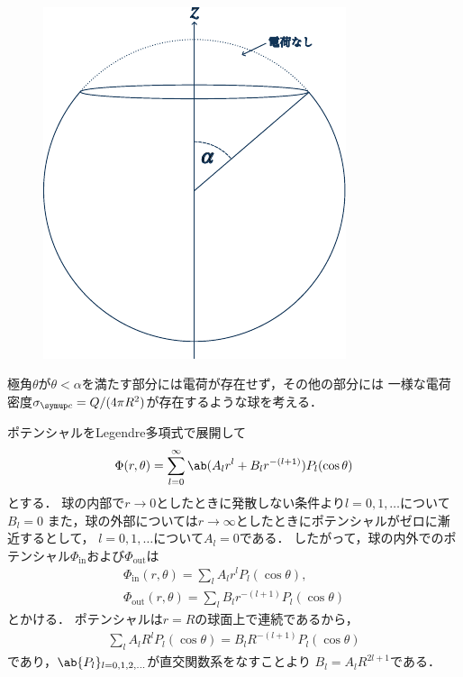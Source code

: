 \hrulefill\\
\begin{figure}
  \centering%
  \includegraphics[width=\linewidth]{fig/Jackson3-2.pdf}%
\end{figure}%
極角$\theta$が$\theta < \alpha$を満たす部分には電荷が存在せず，その他の部分には
一様な電荷密度$\sigma_{\mr{c}} = Q /(4\pi R^2)$が存在するような球を考える．

ポテンシャルをLegendre多項式で展開して
\begin{gather}%
  \Phi(r,\theta) = \sum_{l=0}^\infty \ab(A_l r^l + B_l r^{-(l+1)}) P_l(\cos\theta)
\end{gather}%
とする．
球の内部で$r\to 0$としたときに発散しない条件より$l = 0, 1, \ldots$について$B_l = 0$
また，球の外部については$r \to \infty$としたときにポテンシャルがゼロに漸近するとして，
$l = 0, 1, \ldots$について$A_l = 0$である．
したがって，球の内外でのポテンシャル$\Phi_{\text{in}}$および$\Phi_{\text{out}}$は
\begin{gather}%
  \Phi_{\text{in}}(r,\theta) = \sum_{l} A_l r^l P_l(\cos\theta),\\
  \Phi_{\text{out}}(r,\theta) = \sum_{l} B_l r^{-(l+1)} P_l(\cos\theta)
\end{gather}%
とかける．
ポテンシャルは$r= R$の球面上で連続であるから，
\begin{gather}%
  \sum_l A_l R^l P_l(\cos\theta) = B_l R^{-(l+1)}P_l(\cos\theta)
\end{gather}%
であり，$\ab\{P_l\}_{l=0,1,2,\ldots}$が直交関数系をなすことより
$B_l = A_l R^{2l+1}$である．

